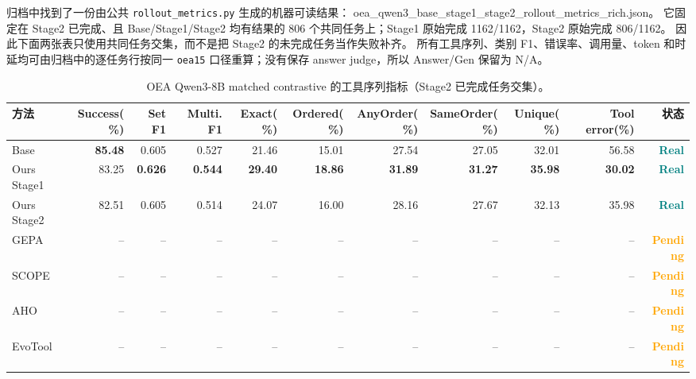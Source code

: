 \documentclass[a4paper,11pt]{article}
\newcommand{\real}{\textcolor{teal}{\textbf{Real}}}
\newcommand{\pending}{\textcolor{orange}{\textbf{Pending}}}
\newcommand{\source}[1]{\begingroup\scriptsize\CJKfamily{gbsn}#1\endgroup}
\begin{document}
\begin{CJK*}{UTF8}{gbsn}
\begin{sloppypar}
归档中找到了一份由公共 \texttt{rollout\_metrics.py} 生成的机器可读结果：
\source{oea\_qwen3\_base\_stage1\_stage2\_rollout\_metrics\_rich.json}。
它固定在 Stage2 已完成、且 Base/Stage1/Stage2 均有结果的 806 个共同任务上；Stage1 原始完成 1162/1162，Stage2 原始完成 806/1162。
因此下面两张表只使用共同任务交集，而不是把 Stage2 的未完成任务当作失败补齐。
所有工具序列、类别 F1、错误率、调用量、token 和时延均可由归档中的逐任务行按同一 \texttt{oea15} 口径重算；没有保存 answer judge，所以 Answer/Gen 保留为 N/A。
\end{sloppypar}

\begin{table}[H]
\centering\scriptsize
\caption{OEA Qwen3-8B matched contrastive 的工具序列指标（Stage2 已完成任务交集）。}
\begin{adjustbox}{max width=\textwidth}
\begin{tabular}{lrrrrrrrrrr}
\toprule
方法 & Success(\%) & Set F1 & Multi. F1 & Exact(\%) & Ordered(\%) & AnyOrder(\%) & SameOrder(\%) & Unique(\%) & Tool error(\%) & 状态\\
\midrule
Base & \textbf{85.48} & 0.605 & 0.527 & 21.46 & 15.01 & 27.54 & 27.05 & 32.01 & 56.58 & \real\\
Ours Stage1 & 83.25 & \textbf{0.626} & \textbf{0.544} & \textbf{29.40} & \textbf{18.86} & \textbf{31.89} & \textbf{31.27} & \textbf{35.98} & \textbf{30.02} & \real\\
Ours Stage2 & 82.51 & 0.605 & 0.514 & 24.07 & 16.00 & 28.16 & 27.67 & 32.13 & 35.98 & \real\\
GEPA & -- & -- & -- & -- & -- & -- & -- & -- & -- & \pending\\
SCOPE & -- & -- & -- & -- & -- & -- & -- & -- & -- & \pending\\
AHO & -- & -- & -- & -- & -- & -- & -- & -- & -- & \pending\\
EvoTool & -- & -- & -- & -- & -- & -- & -- & -- & -- & \pending\\
\bottomrule
\end{tabular}
\end{adjustbox}
\end{table}


\end{CJK*}
\end{document}
